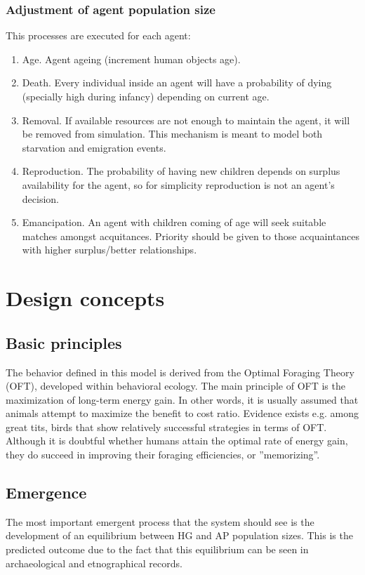 \subsubsection{Adjustment of agent population size}
This processes are executed for each agent:
\begin{enumerate}
\item Age. Agent ageing (increment human objects age).
\item Death. Every individual inside an agent will have a probability of dying (specially high during infancy) depending on current age.
\item Removal. If available resources are not enough to maintain the agent, it will be removed from simulation. This mechanism is meant to model both starvation and emigration events.
\item Reproduction. The probability of having new children depends on surplus availability for the agent, so for simplicity reproduction is not an agent's decision.
\item Emancipation. An agent with children coming of age will seek suitable matches amongst acquitances. Priority should be given to those acquaintances with higher surplus/better relationships.
\end{enumerate}



\section{Design concepts}

\subsection{Basic principles}
The behavior defined in this model is derived from the Optimal Foraging Theory (OFT), developed
within behavioral ecology. The main principle of OFT is the maximization of long-term energy gain. In
other words, it is usually assumed that animals attempt to maximize the benefit to cost ratio. Evidence
exists e.g. among great tits, birds that show relatively successful strategies in terms of OFT. Although
it is doubtful whether humans attain the optimal rate of energy gain, they do succeed in improving their
foraging efficiencies, or ”memorizing”.

\subsection{Emergence}
The most important emergent process that the system should see is the development of an
equilibrium between HG and AP population sizes. This is the predicted outcome due to the fact that
this equilibrium can be seen in archaeological and etnographical records.

